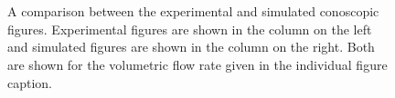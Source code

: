 \begin{figure}
\begin{center}
\\
\\
\end{center}
\caption[Comparison between experimental and simulated conoscopic figures ($\phi_0=45^{\circ}$)]{\label{fig:45_model_data} A comparison between the experimental and simulated conoscopic figures. Experimental figures are shown in the column on the left and simulated figures are shown in the column on the right. Both are shown for the volumetric flow rate given in the individual figure caption.}
\end{figure}

